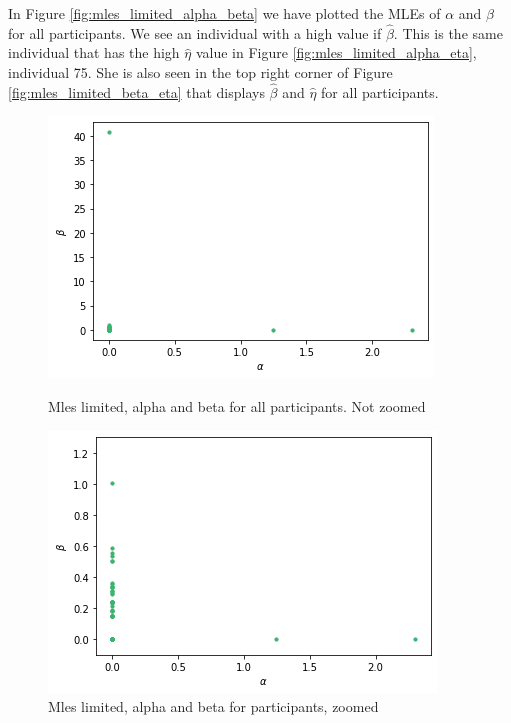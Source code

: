 In Figure \ref{fig:mles_limited_alpha_beta} we have plotted the MLEs of $\alpha$ and $\beta$ for all participants. We see an individual with a high value if $\hat{\beta}$. This is the same individual that has the high $\hat{\eta}$ value in Figure \ref{fig:mles_limited_alpha_eta}, individual 75. She is also seen in the top right corner of Figure \ref{fig:mles_limited_beta_eta} that displays $\hat{\beta}$ and $\hat{\eta}$ for all participants.
\begin{figure}
    \centering
    \begin{minipage}{0.48\textwidth}
        \centering
        \includegraphics[scale=0.38]{pictures/plotted_mles_limited_alpha_beta_gk1.png}
        \caption{Mles limited, alpha and beta for all participants. Not zoomed}
        \label{fig:mles_limited_alpha_beta}
    \end{minipage}\hfill%
    \begin{minipage}{0.48\textwidth}
        \centering
        \includegraphics[scale=0.38]{pictures/plotted_mles_limited_alpha_beta_zoomed_gk1.png}
        \caption{Mles limited, alpha and beta for participants, zoomed}
        \label{fig:mles_limited_alpha_beta_zoomed}
    \end{minipage}
\end{figure}

